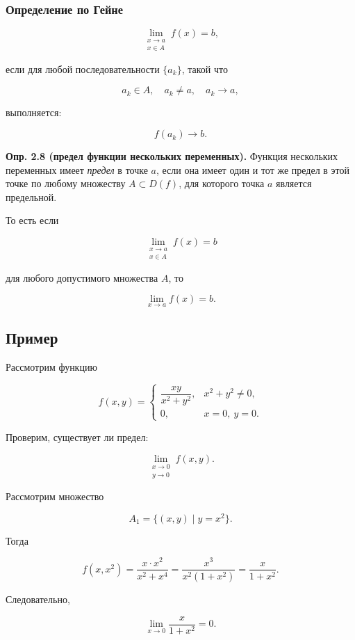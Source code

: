 \documentclass[a4paper,12pt]{article}
\begin{document}
\subsubsection*{Определение по Гейне}

\[
\lim_{\substack{x\to a\\ x\in A}} f(x)=b,
\]

если для любой последовательности $\{a_k\}$, такой что

\[
a_k\in A,\quad a_k\ne a,\quad a_k\to a,
\]

выполняется:

\[
f(a_k)\to b.
\]

\begin{definitionbox}
\textbf{Опр. 2.8 (предел функции нескольких переменных).}
Функция нескольких переменных имеет \textit{предел} в точке $a$, если она имеет один и тот же предел в этой точке по любому множеству $A\subset D(f)$, для которого точка $a$ является предельной.
\end{definitionbox}

То есть если

\[
\lim_{\substack{x\to a\\ x\in A}} f(x)=b
\]

для любого допустимого множества $A$, то

\[
\lim_{x\to a} f(x)=b.
\]

\subsection*{Пример}

Рассмотрим функцию

\[
f(x,y)=
\begin{cases}
\dfrac{xy}{x^2+y^2}, & x^2+y^2\ne 0,\\[6pt]
0, & x=0,\ y=0.
\end{cases}
\]

Проверим, существует ли предел:

\[
\lim_{\substack{x\to 0\\ y\to 0}} f(x,y).
\]

Рассмотрим множество

\[
A_1=\{(x,y)\mid y=x^2\}.
\]

Тогда

\[
f(x,x^2)
=
\frac{x\cdot x^2}{x^2+x^4}
=
\frac{x^3}{x^2(1+x^2)}
=
\frac{x}{1+x^2}.
\]

Следовательно,

\[
\lim_{x\to 0} \frac{x}{1+x^2}=0.
\]
\end{document}
